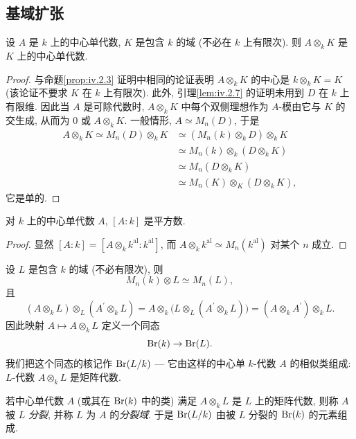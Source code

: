 \subsection*{基域扩张}

\begin{proposition}\label{prop:iv.2.15}
设 $A$ 是 $k$ 上的中心单代数, $K$ 是包含 $k$ 的域 (不必在 $k$ 上有限次). 则 $A\otimes_k K$ 是 $K$ 上的中心单代数.
\end{proposition}

\begin{proof}
与命题\ref{prop:iv.2.3} 证明中相同的论证表明 $A\otimes_k K$ 的中心是 $k\otimes_k K=K$ (该论证不要求 $K$ 在 $k$ 上有限次). 此外, 引理\ref{lem:iv.2.7} 的证明未用到 $D$ 在 $k$ 上有限维. 因此当 $A$ 是可除代数时, $A\otimes_k K$ 中每个双侧理想作为 $A$-模由它与 $K$ 的交生成, 从而为 $0$ 或 $A\otimes_k K$. 一般情形, $A\simeq M_n(D)$, 于是
\[
\begin{aligned}
A\otimes_{k}K\simeq M_{n}(D)\otimes_{k}K&\simeq(M_{n}(k)\otimes_{k}D)\otimes_{k}K\\
&\simeq M_{n}(k)\otimes_{k}(D\otimes_{k}K)\\
&\simeq M_{n}(D\otimes_{k}K)\\
&\simeq M_{n}(K)\otimes_{K}(D\otimes_{k}K),
\end{aligned}
\]
它是单的.
\end{proof}

\begin{corollary}\label{cor:iv.2.16}
对 $k$ 上的中心单代数 $A$, $[A:k]$ 是平方数.
\end{corollary}

\begin{proof}
显然 $[A:k]=[A\otimes_k k^{\mathrm{al}}:k^{\mathrm{al}}]$, 而 $A\otimes_k k^{\mathrm{al}}\simeq M_n(k^{\mathrm{al}})$ 对某个 $n$ 成立.
\end{proof}

设 $L$ 是包含 $k$ 的域 (不必有限次), 则
\[
M_{n}(k)\otimes L\simeq M_{n}(L),
\]
且
\[
(A\otimes_{k}L)\otimes_{L}(A^{\prime}\otimes_{k}L)=A\otimes_{k}\bigl(L\otimes_{L}(A^{\prime}\otimes_{k}L)\bigr)=(A\otimes_{k}A^{\prime})\otimes_{k}L.
\]
因此映射 $A\mapsto A\otimes_k L$ 定义一个同态
\[
\operatorname{Br}(k)\to\operatorname{Br}(L).
\]
我们把这个同态的核记作 $\operatorname{Br}(L/k)$ — 它由这样的中心单 $k$-代数 $A$ 的相似类组成: $L$-代数 $A\otimes_k L$ 是矩阵代数.

若中心单代数 $A$ (或其在 $\operatorname{Br}(k)$ 中的类) 满足 $A\otimes_k L$ 是 $L$ 上的矩阵代数, 则称 $A$ 被 $L$ \emph{分裂}, 并称 $L$ 为 $A$ 的\emph{分裂域}. 于是 $\operatorname{Br}(L/k)$ 由被 $L$ 分裂的 $\operatorname{Br}(k)$ 的元素组成.


